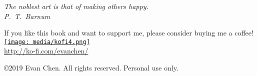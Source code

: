 \begin{titlepage}
	\centering
	\vspace*{15ex}
	\begin{center}
		\itshape
		The noblest art is that of making others happy. \\[2ex]
		P.\ T.\ Barnum
	\end{center}
	\vspace*{18ex}

	\hrulebar
	
	\begin{minipage}{50ex}
		\centering
		If you like this book and want to support me,
		please consider buying me a coffee! \\[2ex]
		\href{http://ko-fi.com/evanchen}{\texttt{[image: media/kofi4.png]}} \\
		\url{http://ko-fi.com/evanchen/}
	\end{minipage}
	\vfill
	\bgroup
	\small \copyright 2019 Evan Chen.
	All rights reserved. Personal use only.
	\egroup
\end{titlepage}

